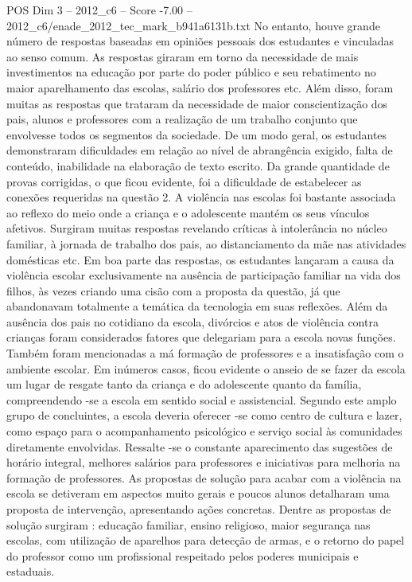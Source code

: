 \begin{textsample}{POS Dim 3 – 2012\_c6 – Score -7.00 – 2012\_c6/enade\_2012\_tec\_mark\_b941a6131b.txt}
No entanto, houve grande número de respostas baseadas em opiniões pessoais dos estudantes e vinculadas ao senso comum.
As respostas giraram em torno da necessidade de mais investimentos na educação por parte do poder público e seu rebatimento no maior aparelhamento das escolas, salário dos professores etc.
Além disso, foram muitas as respostas que trataram da necessidade de maior conscientização dos pais, alunos e professores com a realização de um trabalho conjunto que envolvesse todos os segmentos da sociedade.
De um modo geral, os estudantes demonstraram dificuldades em relação ao nível de abrangência exigido, falta de conteúdo, inabilidade na elaboração de texto escrito.
Da grande quantidade de provas corrigidas, o que ficou evidente, foi a dificuldade de estabelecer as conexões requeridas na questão 2.
A violência nas escolas foi bastante associada ao reflexo do meio onde a criança e o adolescente mantém os seus vínculos afetivos.
Surgiram muitas respostas revelando críticas à intolerância no núcleo familiar, à jornada de trabalho dos pais, ao distanciamento da mãe nas atividades domésticas etc.
Em boa parte das respostas, os estudantes lançaram a causa da violência escolar exclusivamente na ausência de participação familiar na vida dos filhos, às vezes criando uma cisão com a proposta da questão, já que abandonavam totalmente a temática da tecnologia em suas reflexões.
Além da ausência dos pais no cotidiano da escola, divórcios e atos de violência contra crianças foram considerados fatores que delegariam para a escola novas funções.
Também foram mencionadas a má formação de professores e a insatisfação com o ambiente escolar.
Em inúmeros casos, ficou evidente o anseio de se fazer da escola um lugar de resgate tanto da criança e do adolescente quanto da família, compreendendo -se a escola em sentido social e assistencial.
Segundo este amplo grupo de concluintes, a escola deveria oferecer -se como centro de cultura e lazer, como espaço para o acompanhamento psicológico e serviço social às comunidades diretamente envolvidas.
Ressalte -se o constante aparecimento das sugestões de horário integral, melhores salários para professores e iniciativas para melhoria na formação de professores.
As propostas de solução para acabar com a violência na escola se detiveram em aspectos muito gerais e poucos alunos detalharam uma proposta de intervenção, apresentando ações concretas.
Dentre as propostas de solução surgiram : educação familiar, ensino religioso, maior segurança nas escolas, com utilização de aparelhos para detecção de armas, e o retorno do papel do professor como um profissional respeitado pelos poderes municipais e estaduais.

\end{textsample}

